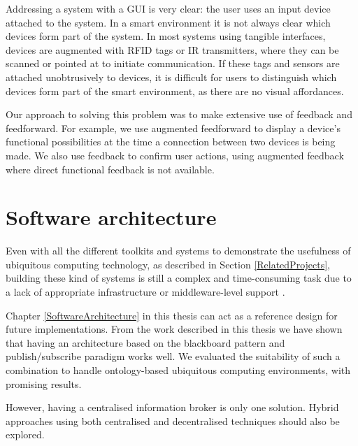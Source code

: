  Addressing a system with a \ac{GUI} is very clear: the user uses an input device attached to the system. In a smart environment it is not always clear which devices form part of the system. In most systems using tangible interfaces, devices are augmented with \ac{RFID} tags or IR transmitters, where they can be scanned or pointed at to initiate communication. If these tags and sensors are attached unobtrusively to devices, it is difficult for users to distinguish which devices form part of the smart environment, as there are no visual affordances. 
	
 Our approach to solving this problem was to make extensive use of feedback and feedforward. For example, we use augmented feedforward to display a device's functional possibilities at the time a connection between two devices is being made. We also use feedback to confirm user actions, using augmented feedback where direct functional feedback is not available.


\section{Software architecture}

Even with all the different toolkits and systems to demonstrate the usefulness of ubiquitous computing technology, as described in Section \ref{RelatedProjects}, building these kind of systems is still a complex and time-consuming task due to a lack of appropriate infrastructure or middle\-ware-level support \cite{Gu2004}.

Chapter \ref{SoftwareArchitecture} in this thesis can act as a reference design for future implementations. From the work described in this thesis we have shown that having an architecture based on the blackboard pattern and publish/subscribe paradigm works well. We evaluated the suitability of such a combination to handle ontology-based ubiquitous computing environments, with promising results.%

However, having a centralised information broker is only one solution. Hybrid approaches using both centralised and decentralised techniques should also be explored.   



